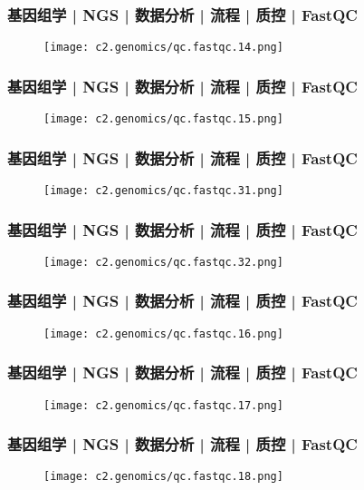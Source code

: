 \begin{frame}
  \frametitle{基因组学 | NGS | 数据分析 | 流程 | 质控 | FastQC}
  \begin{figure}
    \centering
    \texttt{[image: c2.genomics/qc.fastqc.14.png]}
  \end{figure}
\end{frame}

\begin{frame}
  \frametitle{基因组学 | NGS | 数据分析 | 流程 | 质控 | FastQC}
  \begin{figure}
    \centering
    \texttt{[image: c2.genomics/qc.fastqc.15.png]}
  \end{figure}
\end{frame}

\begin{frame}
  \frametitle{基因组学 | NGS | 数据分析 | 流程 | 质控 | FastQC}
  \begin{figure}
    \centering
    \texttt{[image: c2.genomics/qc.fastqc.31.png]}
  \end{figure}
\end{frame}

\begin{frame}
  \frametitle{基因组学 | NGS | 数据分析 | 流程 | 质控 | FastQC}
  \begin{figure}
    \centering
    \texttt{[image: c2.genomics/qc.fastqc.32.png]}
  \end{figure}
\end{frame}

\begin{frame}
  \frametitle{基因组学 | NGS | 数据分析 | 流程 | 质控 | FastQC}
  \begin{figure}
    \centering
    \texttt{[image: c2.genomics/qc.fastqc.16.png]}
  \end{figure}
\end{frame}

\begin{frame}
  \frametitle{基因组学 | NGS | 数据分析 | 流程 | 质控 | FastQC}
  \begin{figure}
    \centering
    \texttt{[image: c2.genomics/qc.fastqc.17.png]}
  \end{figure}
\end{frame}

\begin{frame}
  \frametitle{基因组学 | NGS | 数据分析 | 流程 | 质控 | FastQC}
  \begin{figure}
    \centering
    \texttt{[image: c2.genomics/qc.fastqc.18.png]}
  \end{figure}
\end{frame}

